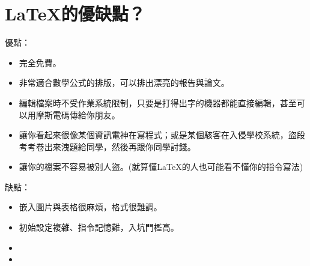 \documentclass[12pt, a4paper, oneside]{extbook}
\let\tmpLaTeX\LaTeX
\renewcommand{\LaTeX}{\textrm{\tmpLaTeX}}
\begin{document}
	\section{\LaTeX 的優缺點？}
		優點：
		\begin{itemize}
			\item 完全免費。
			\item 非常適合數學公式的排版，可以排出漂亮的報告與論文。
			\item 編輯檔案時不受作業系統限制，只要是打得出字的機器都能直接編輯，甚至可以用摩斯電碼傳給你朋友。
			\item 讓你看起來很像某個資訊電神在寫程式；或是某個駭客在入侵學校系統，盜段考考卷出來洩題給同學，然後再跟你同學討錢。
			\item 讓你的檔案不容易被別人盜。(就算懂\LaTeX 的人也可能看不懂你的指令寫法)
		\end{itemize}
		
		缺點：
		\begin{itemize}
			\item 嵌入圖片與表格很麻煩，格式很難調。
			\item 初始設定複雜、指令記憶難，入坑門檻高。
			\item 
			\item 
		\end{itemize}
\end{document}
